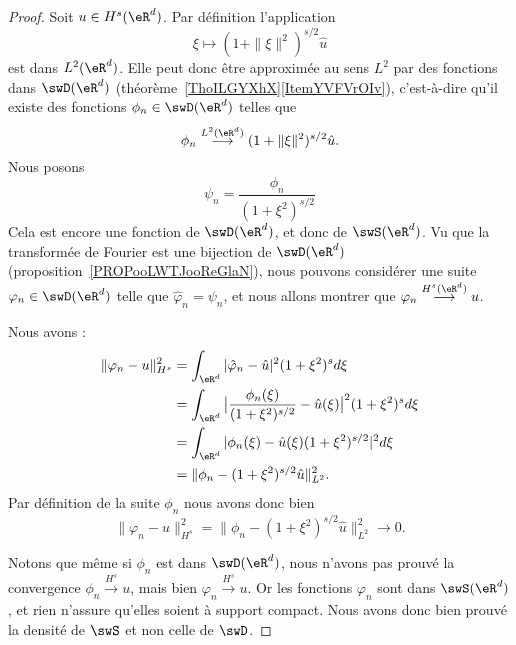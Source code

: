 \begin{proof}
    Soit $u\in H^s(\eR^d)$. Par définition l'application
    \begin{equation}
        \xi\mapsto (1+\| \xi \|^2)^{s/2}\hat u
    \end{equation}
    est dans \( L^2(\eR^d)\). Elle peut donc être approximée au sens \( L^2\) par des fonctions dans \( \swD(\eR^d)\) (théorème~\ref{ThoILGYXhX}\ref{ItemYVFVrOIv}), c'est-à-dire qu'il existe des fonctions \( \phi_n\in\swD(\eR^d)\) telles que
    \begin{equation}
        \phi_n\stackrel{L^2(\eR^d)}{\longrightarrow}(1+\| \xi \|^2)^{s/2}\hat u.
    \end{equation}
    Nous posons
    \begin{equation}
        \psi_n=\frac{ \phi_n }{ (1+\xi^2)^{s/2} }
    \end{equation}
    Cela est encore une fonction de \( \swD(\eR^d)\), et donc de \( \swS(\eR^d)\). Vu que la transformée de Fourier est une bijection de \( \swD(\eR^d)\) (proposition~\ref{PROPooLWTJooReGlaN}), nous pouvons considérer une suite \( \varphi_n\in\swD(\eR^d)\) telle que \( \hat \varphi_n=\psi_n \), et nous allons montrer que \( \varphi_n\stackrel{H^s(\eR^d)}{\longrightarrow}u\).

    Nous avons :
    \begin{subequations}
        \begin{align}
            \| \varphi_n-u \|^2_{H^s}&=\int_{\eR^d}| \hat \varphi_n-\hat u |^2(1+\xi^2)^sd\xi\\
            &=\int_{\eR^d}\big| \frac{ \phi_n(\xi) }{ (1+\xi^2)^{s/2} }-\hat u(\xi) \big|^2(1+\xi^2)^sd\xi\\
            &=\int_{\eR^d}| \phi_n(\xi)-\hat u(\xi)(1+\xi^2)^{s/2} |^2d\xi\\
            &=\| \phi_n-(1+\xi^2)^{s/2}\hat u \|^2_{L^2}.
        \end{align}
    \end{subequations}
    Par définition de la suite \( \phi_n\) nous avons donc bien
    \begin{equation}
            \| \varphi_n-u \|^2_{H^s} =\| \phi_n-(1+\xi^2)^{s/2}\hat u \|^2_{L^2}\to 0.
    \end{equation}

    Notons que même si \( \phi_n\) est dans \( \swD(\eR^d)\), nous n'avons pas prouvé la convergence \( \phi_n\stackrel{H^s}{\longrightarrow}u\), mais bien \( \varphi_n\stackrel{H^s}{\longrightarrow}u\). Or les fonctions \( \varphi_n\) sont dans \( \swS(\eR^d)\), et rien n'assure qu'elles soient à support compact. Nous avons donc bien prouvé la densité de \( \swS\) et non celle de \( \swD\).
\end{proof}

